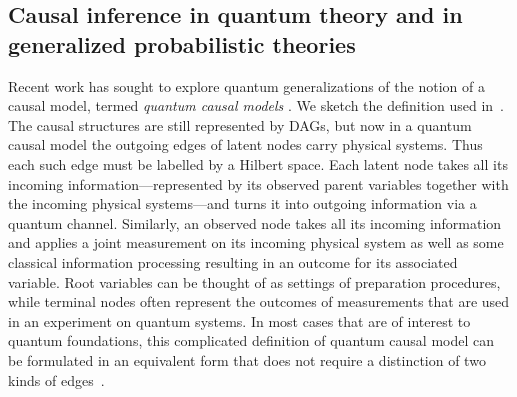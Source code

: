\documentclass[aps,english,superscriptaddress,onecolumn,twoside,longbibliography,pra,floatfix,fleqn,nofootinbib]{revtex4-1}%
\theoremstyle{definition}
\begin{document}








\color{black}


\subsection{Causal inference in quantum theory and in generalized probabilistic theories\label{sec:classicallity}}



Recent work has sought to explore quantum generalizations of the notion of a causal model, termed {\em quantum causal models} \cite{leifer2013conditionalstates,pusey2014gdag,BeyondBellII,Chaves2015infoquantum,ried2015quantum}. We sketch the definition used in~\cite{pusey2014gdag}.
The causal structures are still represented by DAGs, but now in a quantum causal model the outgoing edges of latent nodes carry physical systems. Thus each such edge must be labelled by a Hilbert space. Each latent node takes all its incoming information---represented by its observed parent variables together with the incoming physical systems---and turns it into outgoing information via a quantum channel. Similarly, an observed node takes all its incoming information and applies a joint measurement on its incoming physical system as well as some classical information processing resulting in an outcome for its associated variable. Root variables can be thought of as settings of preparation procedures, while terminal nodes often represent the outcomes of measurements that are used in an experiment on quantum systems. In most cases that are of interest to quantum foundations, this complicated definition of quantum causal model can be formulated in an equivalent form that does not require a distinction of two kinds of edges~\cite{BeyondBellII}.
\end{document}
